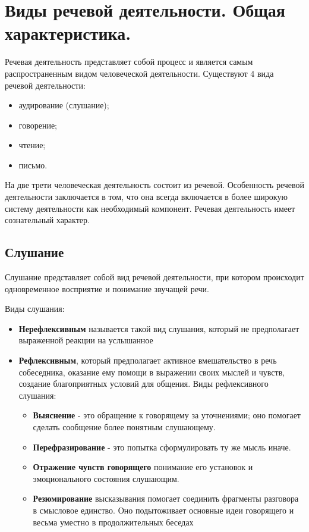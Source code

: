
\section{Виды речевой деятельности. Общая характеристика.}

Речевая деятельность представляет собой процесс и является самым распространенным видом человеческой
деятельности.
Существуют 4 вида речевой деятельности:
\begin{itemize}
	\item аудирование (слушание);
	\item говорение;
	\item чтение;
	\item письмо.
\end{itemize}
На две трети человеческая деятельность состоит из речевой.
Особенность речевой деятельности заключается в том, что она всегда включается в более широкую систему деятельности как необходимый компонент.
Речевая деятельность имеет сознательный характер.

\subsection{Слушание}
Слушание представляет собой вид речевой деятельности, при котором происходит одновременное восприятие и понимание звучащей речи.

Виды слушания:
\begin{itemize}
	\item \textbf{Нерефлексивным} называется такой вид слушания, который
	не предполагает выраженной реакции на услышанное
	\item \textbf{Рефлексивным}, который предполагает активное
	вмешательство в речь собеседника, оказание ему помощи в выражении своих мыслей и чувств, создание благоприятных условий для
	общения. Виды рефлексивного слушания:
	\begin{itemize}
		\renewcommand{\labelitemi}{--}
		\item \textbf{Выяснение} - это обращение к говорящему за уточнениями; оно помогает сделать сообщение более понятным слушающему.
		\item \textbf{Перефразирование} - это попытка сформулировать ту же
		мысль иначе.
		\item \textbf{Отражение чувств говорящего} понимание его установок и эмоционального состояния слушающим.
		\item \textbf{Резюмирование} высказывания помогает соединить фрагменты разговора в смысловое единство. Оно подытоживает основные идеи говорящего и весьма уместно в продолжительных беседах
	\end{itemize}
\end{itemize}
